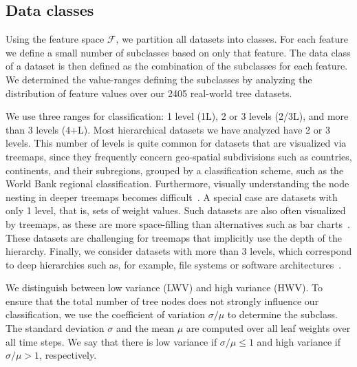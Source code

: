 \subsection{Data classes}
\label{sec:datasampling}
%
Using the feature space $\mathcal{F}$, we partition all datasets into classes. For each feature we define a small number of subclasses based on only that feature. The data class of a dataset is then defined as the combination of the subclasses for each feature. We determined the value-ranges defining the subclasses by analyzing the distribution of feature values over our 2405 real-world tree datasets.  


 We use three ranges for classification: 1 level (1L), 2 or 3 levels (2/3L), and more than 3 levels (4+L). Most hierarchical datasets we have analyzed have 2 or 3 levels. This number of levels is quite common for datasets that are visualized via treemaps, since they frequently concern geo-spatial subdivisions such as countries, continents, and their subregions, grouped by a classification scheme, such as the World Bank regional classification. Furthermore, visually understanding the node nesting in deeper treemaps becomes difficult~\citep{vliegen,sqr}.
A special case are datasets with only 1 level, that is, sets of weight values. Such datasets are also often visualized by treemaps, as these are more space-filling than alternatives such as bar charts~\citep{vliegen}. These datasets are challenging for treemaps that implicitly use the depth of the hierarchy. Finally, we consider datasets with more than 3 levels, which correspond to deep hierarchies such as, for example, file systems or software architectures~\citep{hahn10,Hahn2017,vernier18software}.

 We distinguish between low variance (LWV) and high variance (HWV). To ensure that the total number of tree nodes does not strongly influence our classification, we use the coefficient of variation $\sigma/\mu$ to determine the subclass. The standard deviation $\sigma$ and the mean $\mu$ are computed over all leaf weights over all time steps. We say that there is low variance if $\sigma/\mu \leq 1$ and high variance if $\sigma/\mu > 1$, respectively.


